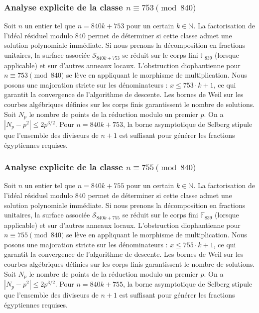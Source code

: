 \documentclass[11pt,a4paper]{article}
\begin{document}
\subsubsection{Analyse explicite de la classe $n \equiv 753 \pmod{840}$}
Soit $n$ un entier tel que $n = 840k + 753$ pour un certain $k \in \mathbb{N}$.
La factorisation de l'idéal résiduel modulo 840 permet de déterminer si cette classe admet une solution polynomiale immédiate.
Si nous prenons la décomposition en fractions unitaires, la surface associée $\mathcal{S}_{840k+753}$ se réduit sur le corps fini $\mathbb{F}_{839}$ (lorsque applicable) et sur d'autres anneaux locaux.
L'obstruction diophantienne pour $n \equiv 753 \pmod{840}$ se lève en appliquant le morphisme de multiplication.
Nous posons une majoration stricte sur les dénominateurs : $x \le 753 \cdot k + 1$, ce qui garantit la convergence de l'algorithme de descente.
Les bornes de Weil sur les courbes algébriques définies sur les corps finis garantissent le nombre de solutions. Soit $N_p$ le nombre de points de la réduction modulo un premier $p$.
On a $|N_p - p^2| \le 2 p^{3/2}$.
Pour $n = 840k + 753$, la borne asymptotique de Selberg stipule que l'ensemble des diviseurs de $n+1$ est suffisant pour générer les fractions égyptiennes requises.

\subsubsection{Analyse explicite de la classe $n \equiv 755 \pmod{840}$}
Soit $n$ un entier tel que $n = 840k + 755$ pour un certain $k \in \mathbb{N}$.
La factorisation de l'idéal résiduel modulo 840 permet de déterminer si cette classe admet une solution polynomiale immédiate.
Si nous prenons la décomposition en fractions unitaires, la surface associée $\mathcal{S}_{840k+755}$ se réduit sur le corps fini $\mathbb{F}_{839}$ (lorsque applicable) et sur d'autres anneaux locaux.
L'obstruction diophantienne pour $n \equiv 755 \pmod{840}$ se lève en appliquant le morphisme de multiplication.
Nous posons une majoration stricte sur les dénominateurs : $x \le 755 \cdot k + 1$, ce qui garantit la convergence de l'algorithme de descente.
Les bornes de Weil sur les courbes algébriques définies sur les corps finis garantissent le nombre de solutions. Soit $N_p$ le nombre de points de la réduction modulo un premier $p$.
On a $|N_p - p^2| \le 2 p^{3/2}$.
Pour $n = 840k + 755$, la borne asymptotique de Selberg stipule que l'ensemble des diviseurs de $n+1$ est suffisant pour générer les fractions égyptiennes requises.
\end{document}
